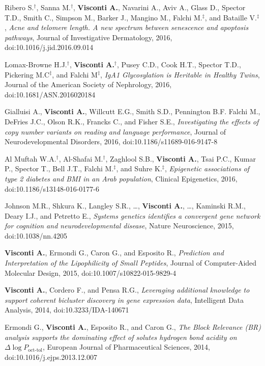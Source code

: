 \documentclass[a4paper,10pt]{article}
\begin{document}
{\begin{itemize}
		 Ribero S.$^{\textbf{$\dag $}}$, Sanna M.$^{\textbf{$\dag $}}$, \textbf{Visconti A.}, Navarini A., Aviv A., Glass D., Spector T.D., Smith C., Simpson M., Barker J., Mangino M., Falchi M.$^{\textbf{$\ddag $}}$, and Bataille V.$^{\textbf{$\ddag $}}$, \emph{Acne and telomere length. A new spectrum between senescence and apoptosis pathways}, Journal of Investigative Dermatology, 2016, doi:10.1016/j.jid.2016.09.014

		 Lomax-Browne H.J.$^{\textbf{$\dag $}}$, \textbf{Visconti A.}$^{\textbf{$\dag $}}$, Pusey C.D., Cook H.T., Spector T.D., Pickering M.C$^{\textbf{$\ddag $}}$, and Falchi M$^{\textbf{$\ddag $}}$, \emph{IgA1 Glycosylation is Heritable in Healthy Twins}, Journal of the American Society of Nephrology, 2016, doi:10.1681/ASN.2016020184

		 Gialluisi A., \textbf{Visconti A.}, Willcutt E.G., Smith S.D., Pennington B.F. Falchi M., DeFries J.C.,  Olson R.K., Francks C., and Fisher S.E., \emph{Investigating the effects of copy number variants on reading and language performance}, Journal of Neurodevelopmental Disorders, 2016, doi:10.1186/s11689-016-9147-8

		 Al Muftah W.A.$^{\textbf{$\dag $}}$, Al-Shafai M.$^{\textbf{$\dag $}}$, Zaghlool S.B., \textbf{Visconti A.}, Tsai P.C., Kumar P., Spector T., Bell J.T., Falchi M.$^{\textbf{$\ddag $}}$, and Suhre K.$^{\textbf{$\ddag $}}$, \emph{Epigenetic associations of type 2 diabetes and BMI in an Arab population}, Clinical Epigenetics, 2016, doi:10.1186/s13148-016-0177-6
		
		 Johnson M.R., Shkura K., Langley S.R., \dots, \textbf{Visconti A.}, \dots, Kaminski R.M., Deary I.J., and Petretto E., \emph{Systems genetics identifies a convergent gene network for cognition and neurodevelopmental disease}, Nature Neuroscience, 2015, doi:10.1038/nn.4205

		 \textbf{Visconti A.}, Ermondi G., Caron G., and Esposito R., \emph{Prediction and Interpretation of the Lipophilicity of Small Peptides}, Journal of Computer-Aided Molecular Design, 2015, doi:10.1007/s10822-015-9829-4
		
		 \textbf{Visconti A.}, Cordero F., and Pensa R.G., \emph{Leveraging additional knowledge to support coherent bicluster discovery in gene expression data}, Intelligent Data Analysis, 2014, doi:10.3233/IDA-140671
	
		 Ermondi G., \textbf{Visconti A.}, Esposito R., and Caron G., \emph{The Block Relevance (BR) analysis supports the dominating effect of solutes hydrogen bond acidity on $\Delta \log P_{\text{oct-tol}}$}, European Journal of Pharmaceutical Sciences, 2014, doi:10.1016/j.ejps.2013.12.007
		

\end{itemize}}
\end{document}
